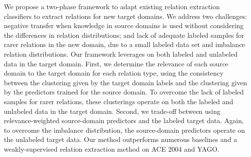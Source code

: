We propose a two-phase framework to adapt existing relation extraction classifiers to extract relations for new target domains. We address two challenges: negative transfer when knowledge in source domains is used without considering the differences in relation distributions; and lack of adequate labeled samples for rarer relations in the new domain, due to a small labeled data set and imbalance relation distributions. Our framework leverages on both labeled and unlabeled data in the target domain. First, we determine the relevance of each source domain to the target domain for each relation type, using the consistency between the clustering given by the target domain labels and the clustering given by the predictors trained for the source domain. To overcome the lack of labeled samples for rarer relations, these clusterings operate on both the labeled and unlabeled data in the target domain. Second, we trade-off between using relevance-weighted source-domain predictors and the labeled target data. Again, to overcome the imbalance distribution, the source-domain predictors operate on the unlabeled target data. Our  method  outperforms numerous baselines and a weakly-supervised relation extraction method on ACE 2004 and YAGO.
